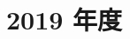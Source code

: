 \documentclass[../../hsm_tok_a.tex]{subfiles}
\begin{document}
    \section{2019 年度}

    

    \clearpage

    
\end{document}

